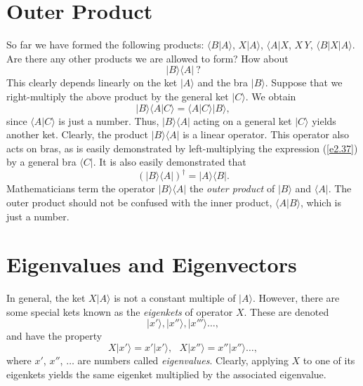 \section{Outer Product}
So far we have formed the following products: $\langle B| A \rangle$, $X| A \rangle$,
$\langle A| X$, $X\,Y$, $\langle B| X | A\rangle$. Are there any other products
we are allowed to form? How about
\begin{equation}\label{e2.37}
|B \rangle \langle A|~?
\end{equation}
This clearly depends linearly on the ket $|A\rangle$ and the bra $|B\rangle$.
Suppose that we right-multiply the above product by the general ket
 $|C \rangle$.
We obtain 
\begin{equation}
|B \rangle \langle A | C\rangle = \langle A | C\rangle |B \rangle,
\end{equation}
since $\langle A | C\rangle$ is just a number. Thus, $|B\rangle \langle A|$ acting
on a general ket $|C\rangle$ yields another ket. Clearly, the product 
$|B\rangle \langle A|$ is a linear  operator. This operator also acts on bras,
as is easily demonstrated by left-multiplying the expression (\ref{e2.37}) by a general
bra $\langle C|$. It is also easily demonstrated that
\begin{equation}
(|B \rangle \langle A|)^{\dag} = |A \rangle \langle B|.
\end{equation}
Mathematicians term the operator $|B \rangle \langle A|$ the {\em outer product}
of $|B \rangle$ and $\langle A|$. The outer product should not be confused with
the inner product, $\langle A|B \rangle$, which is just a number. 

\section{Eigenvalues and Eigenvectors}\label{s2.8}
In general, the ket $X|A\rangle$ is not a constant multiple of $|A\rangle$.
However, there are some special kets 
 known as the {\em eigenkets} of operator $X$. These are denoted
\begin{equation}
|x'\rangle, |x''\rangle, |x'''\rangle \ldots,
\end{equation}
and have the property 
\begin{equation}
X|x'\rangle = x'|x'\rangle,~~~X|x''\rangle = x''|x''\rangle \dots,
\end{equation}
where $x'$, $x''$, $\ldots$ are  numbers called
{\em eigenvalues}. Clearly, applying $X$ to one of its
eigenkets yields the same eigenket multiplied by the associated eigenvalue.

